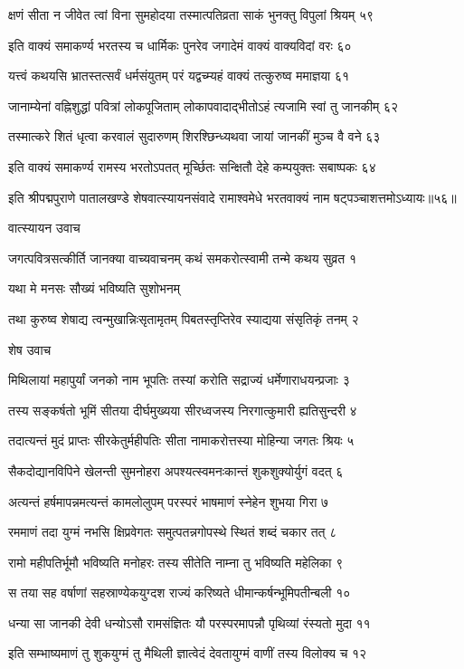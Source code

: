 क्षणं सीता न जीवेत त्वां विना सुमहोदया
तस्मात्पतिव्रता साकं भुनक्तु विपुलां श्रियम् ५९

इति वाक्यं समाकर्ण्य भरतस्य च धार्मिकः
पुनरेव जगादेमं वाक्यं वाक्यविदां वरः ६०

यत्त्वं कथयसि भ्रातस्तत्सर्वं धर्मसंयुतम्
परं यद्वच्म्यहं वाक्यं तत्कुरुष्व ममाज्ञया ६१

जानाम्येनां वह्निशुद्धां पवित्रां लोकपूजिताम्
लोकापवादाद्भीतोऽहं त्यजामि स्वां तु जानकीम् ६२

तस्मात्करे शितं धृत्वा करवालं सुदारुणम्
शिरश्छिन्ध्यथवा जायां जानकीं मुञ्च वै वने ६३

इति वाक्यं समाकर्ण्य रामस्य भरतोऽपतत्
मूर्च्छितः सन्क्षितौ देहे कम्पयुक्तः सबाष्पकः ६४

इति श्रीपद्मपुराणे पातालखण्डे शेषवात्स्यायनसंवादे रामाश्वमेधे भरतवाक्यं नाम षट्पञ्चाशत्तमोऽध्यायः॥५६॥


वात्स्यायन उवाच

जगत्पवित्रसत्कीर्ति जानक्या वाच्यवाचनम्
कथं समकरोत्स्वामी तन्मे कथय सुव्रत १

यथा मे मनसः सौख्यं भविष्यति सुशोभनम्

तथा कुरुष्व शेषाद्य त्वन्मुखान्निःसृतामृतम्
पिबतस्तृप्तिरेव स्याद्यया संसृतिकृं तनम् २

शेष उवाच

मिथिलायां महापुर्यां जनको नाम भूपतिः
तस्यां करोति सद्राज्यं धर्मेणाराधयन्प्रजाः ३

तस्य सङ्कर्षतो भूमिं सीतया दीर्घमुख्यया
सीरध्वजस्य निरगात्कुमारी ह्यतिसुन्दरी ४

तदात्यन्तं मुदं प्राप्तः सीरकेतुर्महीपतिः
सीता नामाकरोत्तस्या मोहिन्या जगतः श्रियः ५

सैकदोद्यानविपिने खेलन्ती सुमनोहरा
अपश्यत्स्वमनःकान्तं शुकशुक्योर्युगं वदत् ६

अत्यन्तं हर्षमापन्नमत्यन्तं कामलोलुपम्
परस्परं भाषमाणं स्नेहेन शुभया गिरा ७

रममाणं तदा युग्मं नभसि क्षिप्रवेगतः
समुत्पतन्नगोपस्थे स्थितं शब्दं चकार तत् ८

रामो महीपतिर्भूमौ भविष्यति मनोहरः
तस्य सीतेति नाम्ना तु भविष्यति महेलिका ९

स तया सह वर्षाणां सहस्राण्येकयुग्दश
राज्यं करिष्यते धीमान्कर्षन्भूमिपतीन्बली १०

धन्या सा जानकी देवी धन्योऽसौ रामसंज्ञितः
यौ परस्परमापन्नौ पृथिव्यां रंस्यतो मुदा ११

इति सम्भाष्यमाणं तु शुकयुग्मं तु मैथिली
ज्ञात्वेदं देवतायुग्मं वाणीं तस्य विलोक्य च १२

